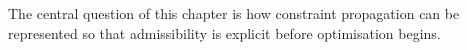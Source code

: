 The central question of this chapter is how constraint propagation can be represented so that admissibility is explicit before optimisation begins.
